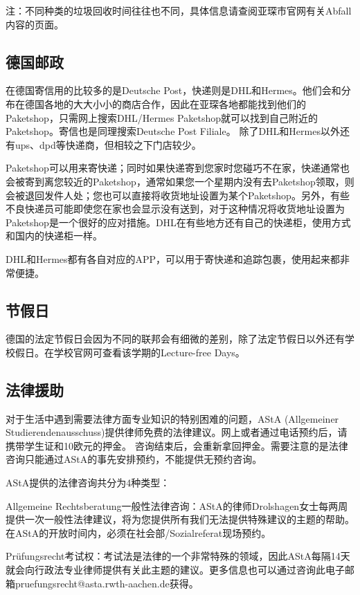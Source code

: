     注：不同种类的垃圾回收时间往往也不同，具体信息请查阅亚琛市官网有关Abfall内容的页面。

  \subsection{德国邮政}\label{subsec:德国邮政}

    在德国寄信用的比较多的是Deutsche Post，快递则是DHL和Hermes。他们会和分布在德国各地的大大小小的商店合作，因此在亚琛各地都能找到他们的Paketshop，只需网上搜索DHL/Hermes Paketshop就可以找到自己附近的Paketshop。寄信也是同理搜索Deutsche Post Filiale。 除了DHL和Hermes以外还有ups、dpd等快递商，但相较之下门店较少。

    Paketshop可以用来寄快递；同时如果快递寄到您家时您碰巧不在家，快递通常也会被寄到离您较近的Paketshop，通常如果您一个星期内没有去Paketshop领取，则会被退回发件人处；您也可以直接将收货地址设置为某个Paketshop。另外，有些不良快递员可能即使您在家也会显示没有送到，对于这种情况将收货地址设置为Paketshop是一个很好的应对措施。DHL在有些地方还有自己的快递柜，使用方式和国内的快递柜一样。

    DHL和Hermes都有各自对应的APP，可以用于寄快递和追踪包裹，使用起来都非常便捷。

  \subsection{节假日}\label{subsec:节假日}

    德国的法定节假日会因为不同的联邦会有细微的差别，除了法定节假日以外还有学校假日。在学校官网可查看该学期的Lecture-free Days。

  \subsection{法律援助}\label{subsec:法律援助}

    对于生活中遇到需要法律方面专业知识的特别困难的问题，AStA (Allgemeiner Studierendenausschuss)提供律师免费的法律建议。网上或者通过电话预约后，请携带学生证和10欧元的押金。 咨询结束后，会重新拿回押金。需要注意的是法律咨询只能通过AStA的事先安排预约，不能提供无预约咨询。

    AStA提供的法律咨询共分为4种类型：

    Allgemeine Rechtsberatung一般性法律咨询：AStA的律师Drolshagen女士每两周提供一次一般性法律建议，将为您提供所有我们无法提供特殊建议的主题的帮助。 在AStA的开放时间内，必须在社会部/Sozialreferat现场预约。

    Prüfungsrecht考试权：考试法是法律的一个非常特殊的领域，因此AStA每隔14天就会向行政法专业律师提供有关此主题的建议。更多信息也可以通过咨询此电子邮箱pruefungsrecht@asta.rwth-aachen.de获得。


